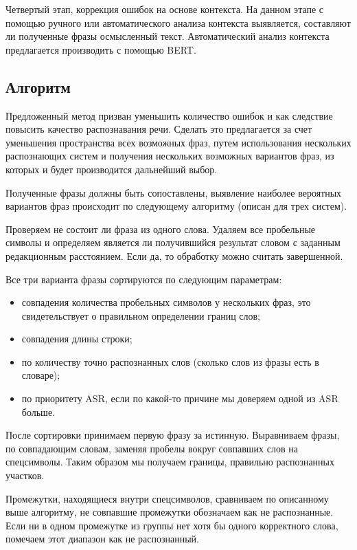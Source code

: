 \documentclass[conference]{IEEEtran}
\begin{document}
Четвертый этап, коррекция ошибок на основе контекста. На данном этапе с помощью ручного или автоматического анализа контекста выявляется, составляют ли полученные фразы осмысленный текст. Автоматический анализ контекста предлагается производить с помощью BERT.

\subsection{Алгоритм}
Предложенный метод призван уменьшить количество ошибок и как следствие повысить качество распознавания речи. Сделать это предлагается за счет уменьшения пространства всех возможных фраз, путем использования нескольких распознающих систем и получения нескольких возможных вариантов фраз, из которых и будет производится дальнейший выбор.

Полученные фразы должны быть сопоставлены, выявление наиболее вероятных вариантов фраз происходит по следующему алгоритму (описан для трех систем).

Проверяем не состоит ли фраза из одного слова. Удаляем все пробельные символы и определяем является ли получившийся результат словом с заданным редакционным расстоянием. Если да, то обработку можно считать завершенной.

Все три варианта фразы сортируются по следующим параметрам:

\begin{itemize}
\item совпадения количества пробельных символов у нескольких фраз, это свидетельствует о правильном определении границ слов;
\item совпадения длины строки;
\item по количеству точно распознанных слов (сколько слов из фразы есть в словаре);
\item по приоритету ASR, если по какой-то причине мы доверяем одной из ASR больше.
\end{itemize}

После сортировки принимаем первую фразу за истинную. Выравниваем фразы, по совпадающим словам, заменяя пробелы вокруг совпавших слов на спецсимволы. Таким образом мы получаем границы, правильно распознанных участков.

Промежутки, находящиеся внутри спецсимволов, сравниваем по описанному выше алгоритму, не совпавшие промежутки обозначаем как не распознанные. Если ни в одном промежутке из группы нет хотя бы одного корректного слова, помечаем этот диапазон как не распознанный.
\end{document}
